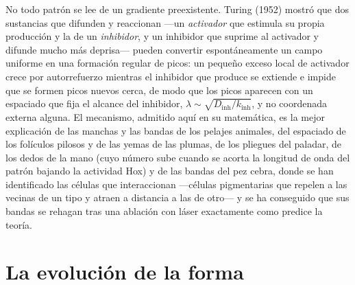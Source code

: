 \begin{proposition}\label{prop:b3:developmental-genetics:turing}
No todo patrón se lee de un gradiente preexistente. Turing (1952)
mostró que dos sustancias que difunden y reaccionan ---un
\emph{activador} que estimula su propia producción y la de un
\emph{inhibidor}, y un inhibidor que suprime al activador y difunde
mucho más deprisa--- pueden convertir espontáneamente un campo uniforme
en una formación regular de picos: un pequeño exceso local de activador
crece por autorrefuerzo mientras el inhibidor que produce se extiende e
impide que se formen picos nuevos cerca, de modo que los picos aparecen
con un espaciado que fija el alcance del inhibidor,
$\lambda \sim \sqrt{D_{\text{inh}}/k_{\text{inh}}}$, y no coordenada
externa alguna. El mecanismo, admitido aquí en su matemática, es la
mejor explicación de las manchas y las bandas de los pelajes animales,
del espaciado de los folículos pilosos y de las yemas de las plumas, de
los pliegues del paladar, de los dedos de la mano (cuyo número sube
cuando se acorta la longitud de onda del patrón bajando la actividad
Hox) y de las bandas del pez cebra, donde se han identificado las
células que interaccionan ---células pigmentarias que repelen a las
vecinas de un tipo y atraen a distancia a las de otro--- y se ha
conseguido que sus bandas se rehagan tras una ablación con láser
exactamente como predice la teoría.
\end{proposition}
\admitted

\section{La evolución de la forma}

